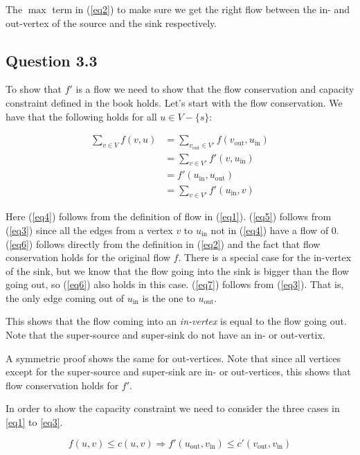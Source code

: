 \documentclass{sig-alternate}
\begin{document}
The $\max$ term in (\ref{eq2}) to make sure we get the right flow between the
in- and out-vertex of the source and the sink respectively.

\subsection*{Question 3.3}

To show that $f'$ is a flow we need to show that the flow conservation and
capacity constraint defined in the book holds. Let's start with the flow
conservation. We have that the following holds for all
$u\in V- \{s\}$:

\begin{align}
    \label{eq4} \sum_{v\in V} f(v,u) &= \sum_{v_{\text{out}} \in V'} f(v_{\text{out}}, u_{\text{in}}) \\
    \label{eq5} &= \sum_{v \in V'} f'(v, u_{\text{in}}) \\
    \label{eq6} &= f'(u_{\text{in}}, u_{\text{out}}) \\
    \label{eq7} &= \sum_{v \in V'} f'(u_{\text{in}}, v)
\end{align}

Here (\ref{eq4}) follows from the definition of flow in (\ref{eq1}).
(\ref{eq5}) follows from (\ref{eq3}) since all the edges from a vertex
$v$ to $u_{\text{in}}$ not in (\ref{eq4}) have a flow of $0$. (\ref{eq6})
follows directly from the definition in (\ref{eq2}) and the fact that flow
conservation holds for the original flow $f$. There is a special case for the
in-vertex of the sink, but we know that the flow going into the sink is bigger
than the flow going out, so (\ref{eq6}) also holds in this case. (\ref{eq7})
follows from (\ref{eq3}). That is, the only edge coming out of $u_{\text{in}}$
is the one to $u_{\text{out}}$.

This shows that the flow coming into an \textit{in-vertex} is equal to the
flow going out. Note that the super-source and super-sink do not have an in-
or out-vertix.

A symmetric proof shows the same for out-vertices. Note that since all vertices
except for the super-source and super-sink are in- or out-vertices, this shows
that flow conservation holds for $f'$.

In order to show the capacity constraint we need to consider the three cases
in \autoref{eq1} to \ref{eq3}.

\begin{equation}
    \label{eq8} f(u,v) \leq c(u,v) \Rightarrow f'(u_{\text{out}}, v_{\text{in}}) \leq c'(v_{\text{out}}, v_{\text{in}})
\end{equation}
\end{document}
